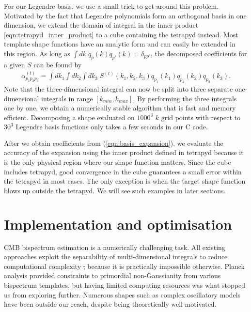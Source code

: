 \documentclass[a4paper,12pt,times,custombib,print,index]{Classes/PhDThesisPSnPDF} %
\providecommand{\DIFadd}[1]{{\protect\color{blue}\uwave{#1}}} %
\providecommand{\DIFdel}[1]{{\protect\color{red}\sout{#1}}}                      %
\providecommand{\DIFaddbegin}{} %
\providecommand{\DIFaddend}{} %
\providecommand{\DIFdelbegin}{} %
\providecommand{\DIFdelend}{} %
\newcommand{\DIFscaledelfig}{0.5}
\newlength{\DIFdelgraphicswidth} %
\newlength{\DIFdelgraphicsheight} %
\newcommand{\DIFaddincludegraphics}[2][]{{\color{blue}\fbox{\DIFOincludegraphics[#1]{#2}}}} %
\newcommand{\DIFdelincludegraphics}[2][]{%
\sbox{\DIFdelgraphicsbox}{\DIFOincludegraphics[#1]{#2}}%
\settoboxwidth{\DIFdelgraphicswidth}{\DIFdelgraphicsbox} %
\settoboxtotalheight{\DIFdelgraphicsheight}{\DIFdelgraphicsbox} %
\scalebox{\DIFscaledelfig}{%
\parbox[b]{\DIFdelgraphicswidth}{\usebox{\DIFdelgraphicsbox}\\[-\baselineskip] \rule{\DIFdelgraphicswidth}{0em}}\llap{\resizebox{\DIFdelgraphicswidth}{\DIFdelgraphicsheight}{%
\setlength{\unitlength}{\DIFdelgraphicswidth}%
\begin{picture}(1,1)%
\thicklines\linethickness{2pt} %
{\color[rgb]{1,0,0}\put(0,0){\framebox(1,1){}}}%
{\color[rgb]{1,0,0}\put(0,0){\line( 1,1){1}}}%
{\color[rgb]{1,0,0}\put(0,1){\line(1,-1){1}}}%
\end{picture}%
}\hspace*{3pt}}} %
} %
\DeclareRobustCommand{\DIFaddbegin}{\DIFOaddbegin \let\includegraphics\DIFaddincludegraphics} %
\DeclareRobustCommand{\DIFaddend}{\DIFOaddend \let\includegraphics\DIFOincludegraphics} %
\DeclareRobustCommand{\DIFdelbegin}{\DIFOdelbegin \let\includegraphics\DIFdelincludegraphics} %
\DeclareRobustCommand{\DIFdelend}{\DIFOaddend \let\includegraphics\DIFOincludegraphics} %
\begin{document}
For our Legendre basis, we use a small trick to get around this problem. Motivated by the fact that Legendre polynomials form an orthogonal basis in one dimension, we extend the domain of integral in the inner product \eqref{eqn:tetrapyd_inner_product} to a cube containing the tetrapyd instead. Most template shape functions have an analytic form and can easily be extended in this region. As long as $\int dk \; q_p(k) q_{p'}(k) = \delta_{pp'}$, the decomposed coefficients for a given $S$ can be found by
\begin{align}
	\alpha^{(t)}_{p_1 p_2 p_3} = \int dk_1 \int dk_2 \int dk_3 \; S^{(t)}(k_1, k_2, k_3) q_{p_1}(k_1) q_{p_2}(k_2) q_{p_3}(k_3). \label{eqn:basis_expansion}
\end{align}
Note that the three-dimensional integral can now be split into three separate one-dimensional integrals in range \DIFdelbegin \DIFdel{$[k_{min}, k_{max}]$}\DIFdelend \DIFaddbegin \DIFadd{$[k_\text{min}, k_\text{max}]$}\DIFaddend . By performing the three integrals one by one, we obtain a numerically stable algorithm that is fast and memory efficient. Decomposing a shape evaluated on $1000^3$ $k$ grid points with respect to $30^3$ Legendre basis functions only takes a few seconds in our \textsc{C} code.

After we obtain coefficients from (\ref{eqn:basis_expansion}), we evaluate the accuracy of the expansion using the inner product defined in tetrapyd because it is the only physical region where our shape function matters. Since the cube includes tetrapyd, good convergence in the cube guarantees a small error within the tetrapyd in most cases. The only exception is when the target shape function blows up outside the tetrapyd. We will see such examples in later sections.


\section{Implementation and optimisation} \label{section:implementation}

CMB bispectrum estimation is a numerically challenging task. All existing approaches exploit the separability of multi-dimensional integrals to reduce computational complexity \DIFdelbegin \DIFdel{, }\DIFdelend because it is practically impossible otherwise. Planck analysis provided constraints to primordial non-Gaussianity from various bispectrum templates, but having limited computing resources was what stopped us from exploring further. Numerous shapes such as complex oscillatory models have been outside our reach, despite being theoretically well-motivated.
\end{document}
